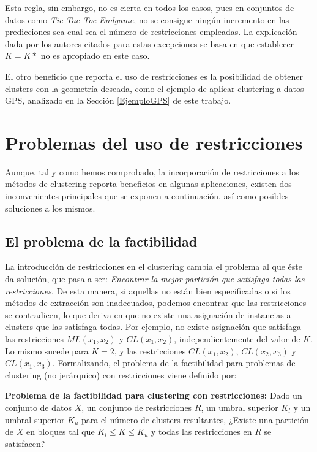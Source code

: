 Esta regla, sin embargo, no es cierta en todos los casos, pues en conjuntos de datos como \textit{Tic-Tac-Toe Endgame}, no se consigue ningún incremento en las predicciones sea cual sea el número de restricciones empleadas. La explicación dada por los autores citados para estas excepciones se basa en que establecer $K = K*$ no es apropiado en este caso.

El otro beneficio que reporta el uso de restricciones es la posibilidad de obtener clusters con la geometría deseada, como el ejemplo de aplicar clustering a datos \acs{GPS}, analizado en la Sección \ref{EjemploGPS} de este trabajo.

\section{Problemas del uso de restricciones} \label{Problemas}

Aunque, tal y como hemos comprobado, la incorporación de restricciones a los métodos de clustering reporta beneficios en algunas aplicaciones, existen dos inconvenientes principales que se exponen a continuación, así como posibles soluciones a los mismos.

\subsection{El problema de la factibilidad}

La introducción de restricciones en el clustering cambia el problema al que éste da solución, que pasa a ser: \textit{Encontrar la mejor partición que satisfaga todas las restricciones}. De esta manera, si aquellas no están bien especificadas o si los métodos de extracción son inadecuados, podemos encontrar que las restricciones se contradicen, lo que deriva en que no existe una asignación de instancias a clusters que las satisfaga todas. Por ejemplo, no existe asignación que satisfaga las restricciones $ML(x_1,x_2)$ y $CL(x_1,x_2)$, independientemente del valor de $K$. Lo mismo sucede para $K = 2$, y las restricciones $CL(x_1, x_2)$, $CL(x_2, x_3)$ y $CL(x_1, x_3)$. Formalizando, el problema de la factibilidad para problemas de clustering (no jerárquico) con restricciones viene definido por:

\begin{definicion}
	
	\textbf{Problema de la factibilidad para clustering con restricciones:} Dado un conjunto de datos $X$, un conjunto de restricciones $R$, un umbral superior $K_l$ y un umbral superior $K_u$ para el número de clusters resultantes, ¿Existe una partición de $X$ en bloques tal que $K_l \le K \le K_u$ y todas las restricciones en $R$ se satisfacen? \cite{DavidsonRavi:2005a} \cite{Survey:2007}
	
\end{definicion}

